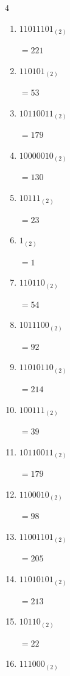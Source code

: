 \begin{multicols}{4}
\begin{enumerate}
        $=46$

  \item $11011101_{(2)}$

        $=221$

  \item $110101_{(2)}$

        $=53$

  \item $10110011_{(2)}$

        $=179$

  \item $10000010_{(2)}$

        $=130$

  \item $10111_{(2)}$

        $=23$

  \item $1_{(2)}$

        $=1$

  \item $110110_{(2)}$

        $=54$

  \item $1011100_{(2)}$

        $=92$

  \item $11010110_{(2)}$

        $=214$

  \item $100111_{(2)}$

        $=39$

  \item $10110011_{(2)}$

        $=179$

  \item $1100010_{(2)}$

        $=98$

  \item $11001101_{(2)}$

        $=205$

\columnbreak %

\resetques

  \item $11010101_{(2)}$

        $=213$

  \item $10110_{(2)}$

        $=22$

  \item $111000_{(2)}$


\end{enumerate}
\end{multicols}
